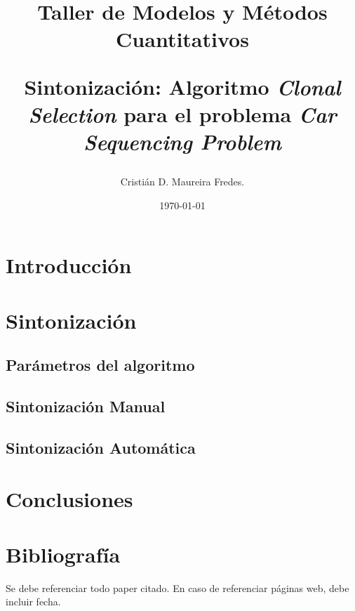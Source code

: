 \documentclass[letter, 10pt]{article}
\begin{document}
\title{Taller de Modelos y Métodos Cuantitativos \\ \begin{Large}Sintonización: Algoritmo \emph{Clonal Selection} para el problema \emph{Car Sequencing Problem}\end{Large}}
\author{Cristián D. Maureira Fredes.}
\date{\today}
\maketitle

\section{Introducción}


\section{Sintonización}

\subsection{Parámetros del algoritmo}


\subsection{Sintonización Manual}


\subsection{Sintonización Automática}


\section{Conclusiones}


\section{Bibliografía}
Se debe referenciar todo paper citado. En caso de referenciar páginas web, debe incluir fecha.
\end{document}
